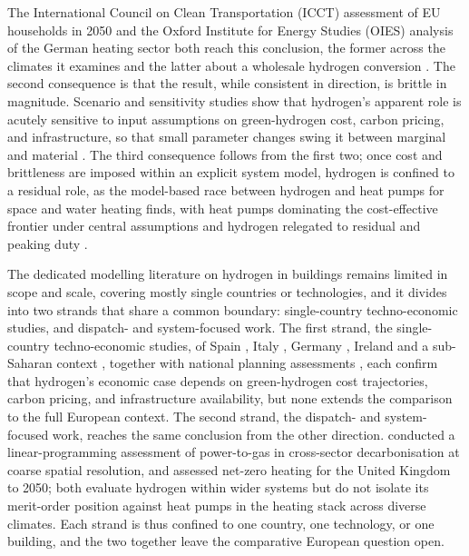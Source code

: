 The International Council on Clean Transportation (ICCT) assessment of EU households in
2050 and the Oxford Institute for Energy Studies (OIES) analysis of the German heating
sector both reach this conclusion, the former across the climates it examines and the
latter about a wholesale hydrogen conversion \citep{ICCT2023h2heating, Dickel2024ET29}.
The second consequence is that the result, while consistent in direction, is brittle in
magnitude. Scenario and sensitivity studies show that hydrogen's apparent role is
acutely sensitive to input assumptions on green-hydrogen cost, carbon pricing, and
infrastructure, so that small parameter changes swing it between marginal and material
\citep{Quarton2019Curious,Marzouk2024Expectations}. The third consequence follows from
the first two; once cost and brittleness are imposed within an explicit system model,
hydrogen is confined to a residual role, as the model-based race between hydrogen and
heat pumps for space and water heating finds, with heat pumps dominating the
cost-effective frontier under central assumptions and hydrogen relegated to residual and
peaking duty \citep{Billerbeck2023Race}.

The dedicated modelling literature on hydrogen in buildings remains limited in
scope and scale, covering mostly single countries or technologies, and it divides
into two strands that share a common boundary: single-country techno-economic
studies, and dispatch- and system-focused work. The first strand, the
single-country techno-economic studies, of Spain \citep{Maestre2021, Maestre2022},
Italy \citep{Masi2024State}, Germany \citep{Huckebrink2022}, Ireland
\citep{Genovese2023} and a sub-Saharan context \citep{Modu2023}, together with
national planning assessments \citep{Jung2023Plan}, each confirm that hydrogen's
economic case depends on green-hydrogen cost trajectories, carbon pricing, and
infrastructure availability, but none extends the comparison to the full European
context. The second strand, the dispatch- and system-focused work, reaches the same
conclusion from the other direction. \citet{Berger2020} conducted a
linear-programming assessment of power-to-gas in cross-sector decarbonisation at
coarse spatial resolution, and \citet{Slorach2021Net} assessed
net-zero heating for the United Kingdom to 2050; both evaluate hydrogen within wider
systems but do not isolate its merit-order position against heat pumps in the
heating stack across diverse climates. Each strand is thus confined to one country,
one technology, or one building, and the two together leave the comparative European
question open.

